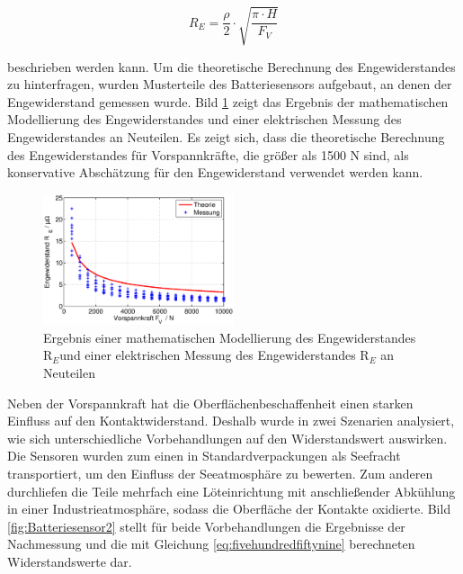 \begin{equation}\label{eq:fivehundredfiftynine}
R_{E} =\dfrac{\rho}{2} \cdot \sqrt{\dfrac{\pi \cdot H}{F_{V}}}
\end{equation}

\noindent beschrieben werden kann. Um die theoretische Berechnung des Engewiderstandes zu hinterfragen, wurden Musterteile des Batteriesensors aufgebaut, an denen der Engewiderstand gemessen wurde. Bild \ref{fig:Batteriesensor1} zeigt das Ergebnis der mathematischen Modellierung des Engewiderstandes und einer elektrischen Messung des Engewiderstandes an Neuteilen. Es zeigt sich, dass die theoretische Berechnung des Engewiderstandes f\"{u}r Vorspannkr\"{a}fte, die gr\"{o}{\ss}er als 1500 N sind, als konservative Absch\"{a}tzung f\"{u}r den Engewiderstand verwendet werden kann.

\noindent 
\begin{figure}[H]
  \centerline{\includegraphics[width=0.5\textwidth]{Kapitel5/Bilder/image11}}
  \caption{Ergebnis einer mathematischen Modellierung des Engewiderstandes R$_{E}$und einer elektrischen Messung des Engewiderstandes R$_{E}$ an Neuteilen}
  \label{fig:Batteriesensor1}
\end{figure}

\noindent Neben der Vorspannkraft hat die Oberfl\"{a}chenbeschaffenheit einen starken Einfluss auf den Kontaktwiderstand. Deshalb wurde in zwei Szenarien analysiert, wie sich unterschiedliche Vorbehandlungen auf den Widerstandswert auswirken. Die Sensoren wurden zum einen in Standardverpackungen als Seefracht transportiert, um den Einfluss der Seeatmosph\"{a}re zu bewerten. Zum anderen durchliefen die Teile mehrfach eine L\"{o}teinrichtung mit anschlie{\ss}ender Abk\"{u}hlung in einer Industrieatmosph\"{a}re, sodass die Oberfl\"{a}che der Kontakte oxidierte. Bild \ref{fig:Batteriesensor2} stellt f\"{u}r beide Vorbehandlungen die Ergebnisse der Nachmessung und die mit Gleichung \eqref{eq:fivehundredfiftynine} berechneten Widerstandswerte dar.

